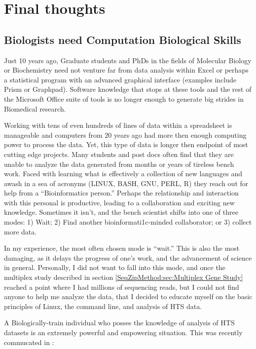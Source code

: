 \section{Final thoughts}
  \label{Disc:sec:Final Thoughts}

  \subsection{Biologists need Computation Biological Skills}
    \label{Disc:subsec:Biologists need Comp Skills}

    Just 10 years ago,  Graduate students and PhDs in the fields of Molecular Biology or Biochemistry need not venture far from data analysis within Excel or perhaps a statistical program with an advanced graphical interface (examples include Prism or Graphpad). Software knowledge that stops at these tools and the rest of the Microsoft Office suite of tools is no longer enough to generate big strides in Biomedical research.

    Working with tens of even hundreds of lines of data within a spreadsheet is manageable and computers from 20 years ago had more then enough computing power to process the data. Yet, this type of data is longer then endpoint of most cutting edge projects. Many students and post docs often find that they are unable to analyze the data generated from months or years of tireless bench work. Faced with learning what is effectively a collection of new languages and awash in a sea of acronyms (LINUX, BASH, GNU, PERL, R) they reach out for help from a ``Bioinformatics person.'' Perhaps the relationship and interaction with this personal is productive, leading to a collaboration and exciting new knowledge. Sometimes it isn't, and the bench scientist shifts into one of three modes: 1) Wait; 2) Find another bioinformati1c-minded collaborator; or 3) collect more data.

    In my experience, the most often chosen mode is ``wait.'' This is also the most damaging, as it delays the progress of one's work, and the advancement of science in general. Personally, I did not want to fall into this mode, and once the multiplex study described in section \ref{SeqZipMethod:sec:Multiplex Gene Study} reached a point where I had millions of sequencing reads, but I could not find anyone to help me analyze the data, that I decided to educate myself on the basic principles of Linux, the command line, and analysis of HTS data.

    A Biologically-train individual who posses the knowledge of analysis of HTS datasets is an extremely powerful and empowering situation. This was recently commucated in \citet{Plocik2013}:

